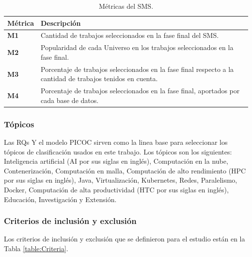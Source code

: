 \begin{table}[htbp]
	\centering
	\caption{Métricas del SMS.}
	\label{table:Metrics}
	\renewcommand{\arraystretch}{1}  %
	\begin{tabular}{p{1cm}p{6.8cm}}
		\toprule
		\textbf{Métrica}  & \textbf{Descripción}                \\
		\midrule
		\textbf{M1} & Cantidad de trabajos seleccionados en la fase final del SMS.\\
		\addlinespace[0.8em]
		\textbf{M2} & Popularidad de cada Universo en los trabajos seleccionados en la fase final.\\
        \addlinespace[0.8em]
		\textbf{M3} & Porcentaje de trabajos seleccionados en la fase final respecto a la cantidad de trabajos tenidos en cuenta.\\
        \addlinespace[0.8em]
		\textbf{M4} & Porcentaje de trabajos seleccionados en la fase final, aportados por cada base de datos.\\
		\bottomrule
	\end{tabular}
\end{table}

\subsubsection{Tópicos}
Las RQs Y el modelo PICOC sirven como la linea base para seleccionar los tópicos de clasificación usados en este trabajo. Los tópicos son los siguientes: Inteligencia artificial (AI por sus siglas en inglés), Computación en la nube, Contenerización, Computación en malla, Computación de alto rendimiento (HPC por sus siglas en inglés), Java, Virtualización, Kubernetes, Redes, Paralelismo, Docker, Computación de alta productividad (HTC por sus siglas en inglés), Educación, Investigación y Extensión.

\subsubsection{Criterios de inclusión y exclusión}
Los criterios de inclusión y exclusión que se definieron para el estudio están en la Tabla \ref{table:Criteria}.

